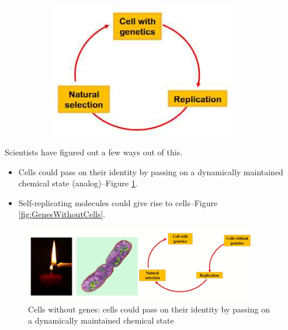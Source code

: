 \documentclass[]{article}
\begin{document}
\begin{figure}[H]
\begin{subfigure}[t]{0.45\textwidth}
		\includegraphics[width=0.9\textwidth]{ChickenEgg2}
	\end{subfigure}
\end{figure}

Scientists have figured out a few ways out of this.

\begin{itemize}
	\item Cells could pass on their identity by passing on a
	dynamically maintained chemical state (analog)--Figure \ref{fig:CellWithoutGenes}.
	\item Self-replicating molecules could give rise to cells--Figure \ref{fig:GenesWithoutCells}.
\end{itemize}

\begin{figure}[H]
	\caption[Cells without genes]{Cells without genes: cells could pass on their identity by passing on a dynamically maintained chemical state }\label{fig:CellWithoutGenes}
	\includegraphics[width=0.9\textwidth]{CellWithoutGenes}
\end{figure}
\end{document}
